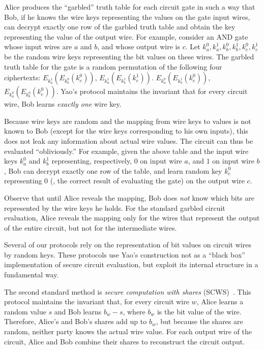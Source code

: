 Alice produces the ``garbled'' truth table for each circuit gate in
such a way that Bob, if he knows the wire keys representing the values
on the gate input wires, can decrypt exactly one row of the garbled
truth table and obtain the key representing the value of the output wire.
For example, consider an AND gate whose input wires are $a$ and $b$,
and whose output wire is $c$.  Let $k^0_a,k^1_a,k^0_b,k^1_b,k^0_c,k^1_c$
be the random wire keys representing the bit values on these wires.
The garbled truth table for the gate is a random permutation of
the following four ciphertexts:
$E_{k^1_a}(E_{k^0_b}(k^0_c))$,
$E_{k^1_a}(E_{k^1_b}(k^1_c))$.
$E_{k^0_a}(E_{k^1_b}(k^0_c))$,
$E_{k^0_a}(E_{k^0_b}(k^0_c))$.
Yao's protocol maintains the invariant that for every circuit wire,
Bob learns \emph{exactly one} wire key.

Because wire keys are random and the mapping from wire keys to values
is not known to Bob (except for the wire keys corresponding to his own
inputs), this does not leak any information about actual wire values.
The circuit can thus be evaluated ``obliviously.''  For example, given
the above table and the input wire keys $k^0_a$ and $k^1_b$ representing,
respectively, $0$ on input wire $a$, and $1$ on input wire $b$, Bob
can decrypt exactly one row of the table, and learn random key $k^0_c$
representing $0$ (\ie, the correct result of evaluating the gate) on
the output wire $c$.

Observe that until Alice reveals the mapping, Bob does \emph{not}
know which bits are represented by the wire keys he holds.  For the
standard garbled circuit evaluation, Alice reveals the mapping only
for the wires that represent the output of the entire circuit, but
not for the intermediate wires.

Several of our protocols rely on the representation of bit values on
circuit wires by random keys.   These protocols use Yao's construction
not as a ``black box'' implementation of secure circuit evaluation,
but exploit its internal structure in a fundamental way.

The second standard method is \emph{secure computation with shares}
(SCWS)~\cite[Chapter 7]{Goldreich:vol2}.  This protocol maintains
the invariant that, for every circuit wire $w$, Alice learns a random
value $s$ and Bob learns $b_w - s$, where $b_w$ is the bit value of
the wire.  Therefore, Alice's and Bob's shares add up to $b_w$, but
because the shares are random, neither party knows the actual wire value.
For each output wire of the circuit, Alice and Bob combine their shares to
reconstruct the circuit output.  


